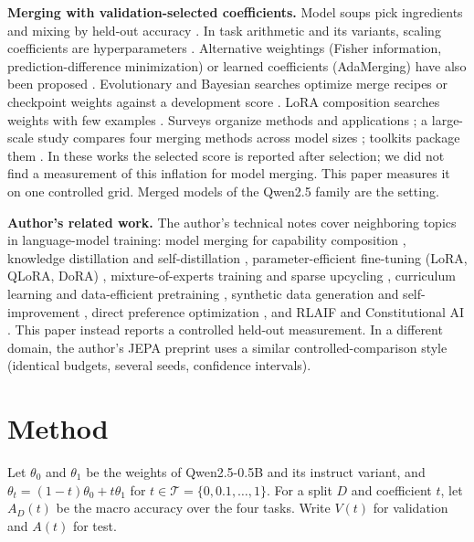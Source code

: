\documentclass[conference]{IEEEtran}
\begin{document}
\textbf{Merging with validation-selected coefficients.} Model soups pick ingredients and mixing by held-out accuracy \cite{wortsman2022soups}. In task arithmetic and its variants, scaling coefficients are hyperparameters \cite{ilharco2022taskarithmetic,yadav2023ties}. Alternative weightings (Fisher information, prediction-difference minimization) or learned coefficients (AdaMerging) have also been proposed \cite{matena2021fisher,jin2022dataless,yang2023adamerging}. Evolutionary and Bayesian searches optimize merge recipes or checkpoint weights against a development score \cite{akiba2024evolutionary,liu2024checkpointbo}. LoRA composition searches weights with few examples \cite{huang2023lorahub}. Surveys organize methods and applications \cite{yang2024survey}; a large-scale study compares four merging methods across model sizes \cite{yadav2024scale}; toolkits package them \cite{goddard2024mergekit}. In these works the selected score is reported after selection; we did not find a measurement of this inflation for model merging. This paper measures it on one controlled grid. Merged models of the Qwen2.5 family \cite{qwen2024qwen25} are the setting.

\textbf{Author's related work.} The author's technical notes cover neighboring topics in language-model training: model merging for capability composition \cite{santos2026modelmergingfo}, knowledge distillation and self-distillation \cite{santos2026knowledgedisti}, parameter-efficient fine-tuning (LoRA, QLoRA, DoRA) \cite{santos2026parametereffic}, mixture-of-experts training and sparse upcycling \cite{santos2026mixtureofexper}, curriculum learning and data-efficient pretraining \cite{santos2026curriculumlear}, synthetic data generation and self-improvement \cite{santos2026syntheticdatag}, direct preference optimization \cite{santos2026directpreferen}, and RLAIF and Constitutional AI \cite{santos2026rlaifandconsti}. This paper instead reports a controlled held-out measurement. In a different domain, the author's JEPA preprint \cite{santos2026collapseresist} uses a similar controlled-comparison style (identical budgets, several seeds, confidence intervals).

\section{Method}
Let $\theta_0$ and $\theta_1$ be the weights of Qwen2.5-0.5B and its instruct variant, and $\theta_t=(1-t)\theta_0+t\theta_1$ for $t\in\mathcal{T}=\{0,0.1,\dots,1\}$. For a split $D$ and coefficient $t$, let $A_D(t)$ be the macro accuracy over the four tasks. Write $V(t)$ for validation and $A(t)$ for test.
\end{document}
